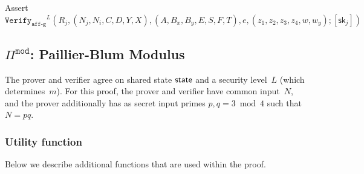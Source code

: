 \documentclass[11pt]{article}
\newenvironment{inlineAlgorithm}{}{}
\def\state{{\sf state}}
\newcommand{\proof}[1]{\ensuremath{\Pi^{\mathtt{#1}}}}
\newcommand{\verify}[1]{\ensuremath{\mathtt{Verify}_{\mathtt{#1}}}}
\newcommand{\sk}{\textsf{sk}}
\newcommand{\E}{\mathbb{E}}
\newcommand{\?}[1]{\stackrel{?}{#1}}
\begin{document}
\begin{description}
\begin{inlineAlgorithm}
\begin{algorithmic}[1]
\Comment{$q = |\E|$}
\State Assert $\verify{aff\mbox{-}g}^L(
    R_j,
    (N_j, N_i, C, D, Y, X),
    (A, B_x, B_y, E, S, F, T),
    e,
    (z_1, z_2, z_3, z_4, w, w_y);
    [\sk_j]
)$
\end{algorithmic}
\end{inlineAlgorithm}

\end{description}

\subsection{$\proof{mod}$: Paillier-Blum Modulus}
The prover and verifier agree on shared state $\state$ and a security level~$L$ (which determines~$m$). For this proof, the prover and verifier have common input~$N$, and the prover additionally has as secret input primes $p, q=3 \bmod 4$ such that~$N=pq$.

\subsubsection{Utility function}
Below we describe additional functions that are used within the proof.
\end{document}
